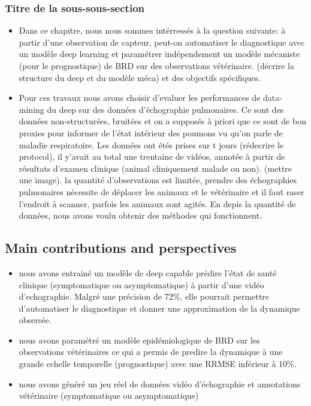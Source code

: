 \subsubsection{Titre de la sous-sous-section}


\begin{itemize}
    \item Dans ce chapitre, nous nous sommes intérressés à la question  suivante: à partir d'une observation de capteur, peut-on automatiser le diagnostique avec un modèle deep learning et paramétrer indépendement un modèle mécaniste (pour le prognostique) de BRD sur des observations vétérinaire. (décrire la structure du deep et du modèle méca) et des objectifs spécifiques.
    \item Pour ces travaux nous avons choisir d'evaluer les performances de data-mining du deep sur des données d'échographie pulmonaires. Ce sont des données non-structurées, bruitées et on a supposés à priori que ce sont de bon proxies pour informer de l'état intérieur des poumons vu qu'on parle de maladie respiratoire.
    Les données ont étés prises sur t jours (rédecrire le protocol), il y'avait au total une trentaine de vidéos, annotée à partir de résultats d'examen clinique (animal cliniquement malade ou non).  (mettre une image). la quantité d'observations est limitée, prendre des échographies pulmonaires nécessite de déplacer les animaux et le vétérinaire et il faut raser l'endroit à scanner, parfois les animaux sont agités. En depis la quantité de données, nous avons voulu obtenir des méthodes qui fonctionnent.
\end{itemize}


\subsection{Main contributions and perspectives}


\begin{itemize}
    \item nous avons entrainé un modèle de deep capable prédire l'état de santé clinique (symptomatique ou asymptomatique) à partir d'une vidéo d'echographie. Malgré une précision de 72\%, elle pourrait permettre d'automatiser le diagnostique et donner une approximation de la dynamique obsersée.
    \item nous avons paramétré un modèle epidémiologique de BRD sur les observations vétérinaires ce qui a permis de predire la dynamique à une grande echelle temporelle (prognostique) avec une RRMSE inférieur à 10\%. 
    \item nous avons généré un jeu réel de données vidéo d'échographie et annotations vétérinaire (symptomatique ou asymptomatique)
\end{itemize}

